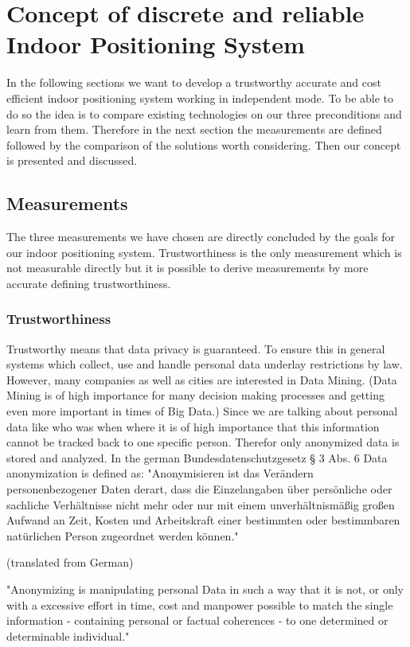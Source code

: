 \section{Concept of discrete and reliable Indoor Positioning System}\label{concept} %

In the following sections we want to develop a trustworthy accurate and cost efficient indoor positioning system working in independent mode. To be able to do so the idea is to compare existing technologies on our three preconditions and learn from them. Therefore in the next section the measurements are defined followed by the comparison of the solutions worth considering. Then our concept is presented and discussed.   
 
\subsection{Measurements}
The three measurements we have chosen are directly concluded by the goals for our indoor positioning system. Trustworthiness is the only measurement which is not measurable directly but it is possible to derive measurements by more accurate defining trustworthiness.

\subsubsection{Trustworthiness}
Trustworthy means that data privacy is guaranteed. To ensure this in general systems which collect, use and handle personal data underlay restrictions by law. However, many companies as well as cities are interested in Data Mining. (Data Mining is of high importance for many decision making processes and getting even more important in times of Big Data.) Since we are talking about personal data like who was when where it is of high importance that this information cannot be tracked back to one specific person. Therefor only anonymized data is stored and analyzed. In the german Bundesdatenschutzgesetz § 3 Abs. 6 Data anonymization is defined as:
"Anonymisieren ist das Verändern personenbezogener Daten derart, dass die Einzelangaben über persönliche oder sachliche Verhältnisse nicht mehr oder nur mit einem unverhältnismäßig großen Aufwand an Zeit, Kosten und Arbeitskraft einer bestimmten oder bestimmbaren natürlichen Person zugeordnet werden können." \parencite{BDSG}

(translated from German)

"Anonymizing is manipulating personal Data in such a way that it is not, or only with a excessive effort in time, cost and manpower possible to match the single information - containing personal or factual coherences -  to one determined or determinable individual." \parencite{BDSG}

